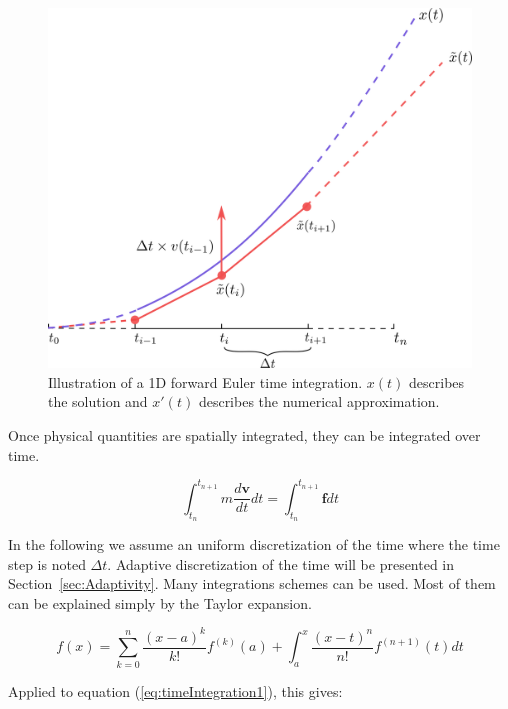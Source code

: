\begin{figure}[!ht]
\centering
\includegraphics[scale=0.6]{images/continuum_mechanics/timeIntegration.png}
\caption[STAR mechanics: Temporal integration]{\label{fig:timeIntegration} 
	Illustration of a 1D forward Euler time integration. 
	$x(t)$ describes the solution and $x'(t)$ describes the numerical approximation.}
\end{figure}

Once physical quantities are spatially integrated, they can be integrated over time. 

\begin{equation}
\label{eq:timeIntegration1}
\displaystyle
\int_{t_{n}}^{t_{n+1}}
m \frac{d\mathbf{v}}{dt} dt
=
\int_{t_{n}}^{t_{n+1}}\mathbf{f} dt
\end{equation}

In the following we assume an uniform discretization of the time where the time step is noted $\Delta t$.
Adaptive discretization of the time will be presented in Section~\ref{sec:Adaptivity}.
Many integrations schemes can be used. 
Most of them can be explained simply by the Taylor expansion.

\begin{equation}
\label{eq:taylorExpansion}
\displaystyle
f(x) = \sum_{k=0}^{n}\frac{\left(x-a\right)^{k}}{k!}f^{(k)}(a) + \int_{a}^{x}\frac{\left(x-t\right)^{n}}{n!}f^{(n+1)}(t)dt
\end{equation}

Applied to equation (\ref{eq:timeIntegration1}), this gives:

